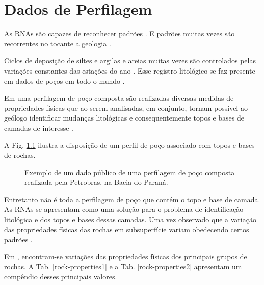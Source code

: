 \chapter{Dados de Perfilagem}

As RNAs são capazes de reconhecer padrões \citep{Konate2014,Kumar2015}. E padrões muitas vezes são recorrentes no tocante a geologia \citep{Vail_1977}. 

Ciclos de deposição de siltes e argilas e areias muitas vezes são controlados pelas variações constantes das estações do ano \citep{Milani1998,CristinaLopesQuintas1999,Milani2000} . Esse registro litológico se faz presente em dados de poços em todo o mundo \citep{Scherer2006}.

Em uma perfilagem de poço composta são realizadas diversas medidas de propriedades físicas que ao serem analisadas, em conjunto, tornam possível ao geólogo identificar mudanças litológicas e consequentemente topos e bases de camadas de interesse \citep{FrancaAlmerio&Potter1991,Zalan2007,artur_paleoestruturas_2008}. 

A Fig. \ref{PerfilComposto} ilustra a disposição de um perfil de poço associado com topos e bases de rochas. 

\begin{figure}[H]
		\centering
	\setlength{\fboxsep}{8pt}
	\setlength{\fboxrule}{0.1pt}
	\caption{Exemplo de um dado público de uma perfilagem de poço composta realizada pela Petrobras, na Bacia do Paraná.}
	\label{PerfilComposto}
\end{figure}

Entretanto não é toda a perfilagem de poço que contém o topo e base de camada. As RNAs se apresentam como uma solução para o problema de identificação litológica e dos topos e bases dessas camadas. Uma vez observado que a variação das propriedades físicas das rochas em subsuperfície variam obedecendo certos padrões \citep{Yan2014}. 

Em \citet{Telford_1993}, encontram-se variações das propriedades físicas dos principais grupos de rochas. A Tab. \ref{rock-properties1} e a Tab. \ref{rock-properties2} apresentam um compêndio desses principais valores.  

